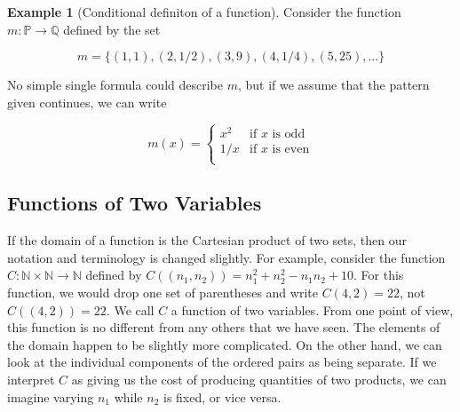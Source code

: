 \documentclass[10pt,]{book}
\theoremstyle{plain}
\theoremstyle{definition}
\theoremstyle{definition}
\newtheorem{example}[theorem]{Example}
\theoremstyle{definition}
\begin{document}
\begin{example}[Conditional definiton of a function]\label{ex-conditional-function}
 Consider the function \(m:\mathbb{P} \rightarrow  \mathbb{Q}\) defined by the set

\begin{equation*}m = \{(1, 1), (2, 1/2), (3, 9), (4, 1/4), (5, 25), . . . \} \end{equation*}

No simple single formula could describe \(m\), but if we assume that the pattern given continues, we can write

 \begin{equation*}m(x) =\left\{
\begin{array}{cc}
 x^2 &  \textrm{if } x \textrm{ is odd} \\
 1/x & \textrm{if } x \textrm{ is even} \\
\end{array}
\right.\end{equation*}
%
\end{example}
\typeout{************************************************}
\typeout{************************************************}
\subsection[Functions of Two Variables]{Functions of Two Variables}\label{ss-two-variables}
If the domain of a function is the Cartesian product of two sets, then our notation and terminology is changed slightly. For example, consider the
function \(C:\mathbb{N} \times \mathbb{N}\rightarrow \mathbb{N}\) defined by \(C\left(\left(n_1,n_2\right)\right)=n_1^2+n_2^2- n_1n_2+10\).  For
this function, we would drop one set of parentheses and write \(C(4, 2) = 22\), not \(C((4, 2)) = 22\). We call \(C\) a function of two variables.
From one point of view, this function is no different from any others that we have seen. The elements of the domain happen to be slightly more complicated.
On the other hand, we can look at the individual components of the ordered pairs as being separate. If we interpret \(C\) as giving us the cost of
producing quantities of two products, we can imagine varying \(n_1\) while \(n_2\) is fixed, or vice versa.%
\typeout{************************************************}
\typeout{************************************************}
\end{document}
